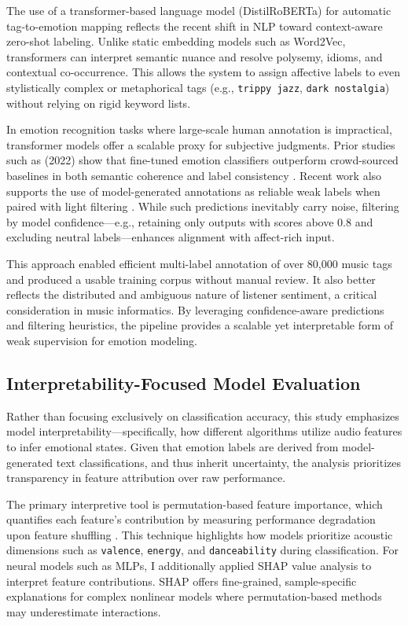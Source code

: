 \documentclass{article}
\begin{document}
The use of a transformer-based language model (DistilRoBERTa) for automatic tag-to-emotion mapping reflects the recent shift in NLP toward context-aware zero-shot labeling. Unlike static embedding models such as Word2Vec, transformers can interpret semantic nuance and resolve polysemy, idioms, and contextual co-occurrence. This allows the system to assign affective labels to even stylistically complex or metaphorical tags (e.g., \texttt{trippy jazz}, \texttt{dark nostalgia}) without relying on rigid keyword lists.

In emotion recognition tasks where large-scale human annotation is impractical, transformer models offer a scalable proxy for subjective judgments. Prior studies such as \textcite{Hartman2022}(2022) show that fine-tuned emotion classifiers outperform crowd-sourced baselines in both semantic coherence and label consistency \parencite{Hartman2022}. Recent work also supports the use of model-generated annotations as reliable weak labels when paired with light filtering \parencite{Artemova2025, Kim2024}. While such predictions inevitably carry noise, filtering by model confidence—e.g., retaining only outputs with scores above 0.8 and excluding neutral labels—enhances alignment with affect-rich input.

This approach enabled efficient multi-label annotation of over 80,000 music tags and produced a usable training corpus without manual review. It also better reflects the distributed and ambiguous nature of listener sentiment, a critical consideration in music informatics. By leveraging confidence-aware predictions and filtering heuristics, the pipeline provides a scalable yet interpretable form of weak supervision for emotion modeling.

\subsection{Interpretability-Focused Model Evaluation}

Rather than focusing exclusively on classification accuracy, this study emphasizes model interpretability—specifically, how different algorithms utilize audio features to infer emotional states. Given that emotion labels are derived from model-generated text classifications, and thus inherit uncertainty, the analysis prioritizes transparency in feature attribution over raw performance.

The primary interpretive tool is permutation-based feature importance, which quantifies each feature’s contribution by measuring performance degradation upon feature shuffling \parencite{Fisher2019}. This technique highlights how models prioritize acoustic dimensions such as \texttt{valence}, \texttt{energy}, and \texttt{danceability} during classification. For neural models such as MLPs, I additionally applied SHAP value analysis to interpret feature contributions. SHAP offers fine-grained, sample-specific explanations for complex nonlinear models where permutation-based methods may underestimate interactions.
\end{document}
